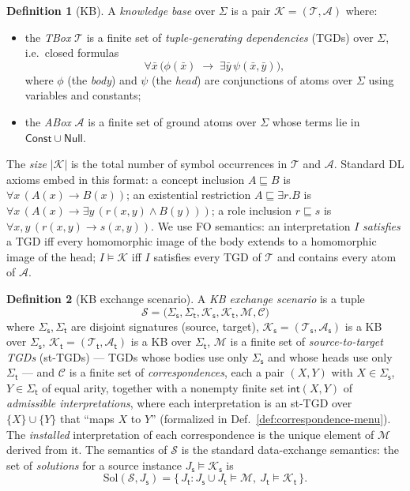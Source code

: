 \documentclass{amsart}
\theoremstyle{definition}
\newtheorem{definition}{Definition}
\newcommand{\Tbox}{\mathcal{T}}
\newcommand{\Abox}{\mathcal{A}}
\newcommand{\KB}{\mathcal{K}}
\newcommand{\Sig}{\Sigma}
\newcommand{\Map}{\mathcal{M}}
\newcommand{\src}{\mathsf{s}}
\newcommand{\trg}{\mathsf{t}}
\newcommand{\Scn}{\mathcal{S}}
\newcommand{\Cor}{\mathcal{C}}
\begin{document}
\begin{definition}[KB]\label{def:kb}
A \emph{knowledge base} over $\Sig$ is a pair $\KB=(\Tbox,\Abox)$ where:
\begin{itemize}[nosep]
\item the \emph{TBox} $\Tbox$ is a finite set of \emph{tuple-generating
dependencies} (TGDs) over $\Sig$, i.e.\ closed formulas
\[
\forall \bar x\,\Big(\phi(\bar x)\;\rightarrow\;\exists\bar y\,\psi(\bar x,\bar y)\Big),
\]
where $\phi$ (the \emph{body}) and $\psi$ (the \emph{head}) are conjunctions of
atoms over $\Sig$ using variables and constants;
\item the \emph{ABox} $\Abox$ is a finite set of ground atoms over $\Sig$ whose
terms lie in $\mathsf{Const}\cup\mathsf{Null}$.
\end{itemize}
The \emph{size} $|\KB|$ is the total number of symbol occurrences in $\Tbox$ and
$\Abox$. Standard DL axioms embed in this format: a concept inclusion
$A\sqsubseteq B$ is $\forall x\,(A(x)\to B(x))$; an existential restriction
$A\sqsubseteq\exists r.B$ is $\forall x\,(A(x)\to\exists y\,(r(x,y)\wedge B(y)))$;
a role inclusion $r\sqsubseteq s$ is $\forall x,y\,(r(x,y)\to s(x,y))$. We use FO
semantics: an interpretation $I$ \emph{satisfies} a TGD iff every homomorphic
image of the body extends to a homomorphic image of the head; $I\models\KB$ iff
$I$ satisfies every TGD of $\Tbox$ and contains every atom of $\Abox$.
\end{definition}

\begin{definition}[KB exchange scenario]\label{def:scenario}
A \emph{KB exchange scenario} is a tuple
\[
\Scn=\bigl(\Sig_\src,\Sig_\trg,\KB_\src,\KB_\trg,\Map,\Cor\bigr)
\]
where $\Sig_\src,\Sig_\trg$ are disjoint signatures (source, target),
$\KB_\src=(\Tbox_\src,\Abox_\src)$ is a KB over $\Sig_\src$,
$\KB_\trg=(\Tbox_\trg,\Abox_\trg)$ is a KB over $\Sig_\trg$, $\Map$ is a finite
set of \emph{source-to-target TGDs} (st-TGDs) — TGDs whose bodies use only
$\Sig_\src$ and whose heads use only $\Sig_\trg$ — and $\Cor$ is a finite set of
\emph{correspondences}, each a pair $(X,Y)$ with $X\in\Sig_\src$, $Y\in\Sig_\trg$
of equal arity, together with a nonempty finite set $\mathsf{int}(X,Y)$ of
\emph{admissible interpretations}, where each interpretation is an st-TGD over
$\{X\}\cup\{Y\}$ that ``maps $X$ to $Y$'' (formalized in
Def.~\ref{def:correspondence-menu}). The \emph{installed} interpretation of each
correspondence is the unique element of $\Map$ derived from it. The semantics of
$\Scn$ is the standard data-exchange semantics: the set of \emph{solutions} for a
source instance $J_\src\models\KB_\src$ is
\[
\mathrm{Sol}(\Scn,J_\src)=\{\,J_\trg : J_\src\cup J_\trg\models \Map,\ J_\trg\models\KB_\trg\,\}.
\]
\end{definition}
\end{document}
